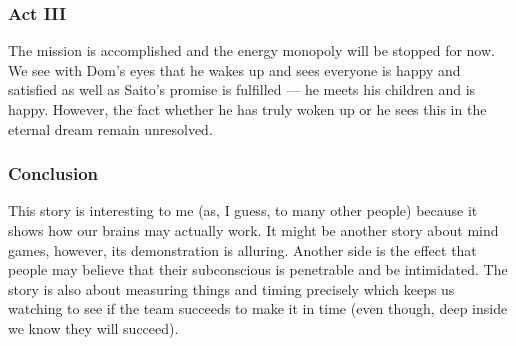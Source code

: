 \documentclass{article}
\begin{document}
\subsubsection*{Act III}

The mission is accomplished and the energy monopoly will be stopped for now. We
see with Dom's eyes that he wakes up and sees everyone is happy and satisfied as
well as Saito's promise is fulfilled --- he meets his children and is happy.
However, the fact whether he has truly woken up or he sees this in the eternal
dream remain unresolved.

\subsubsection*{Conclusion}

This story is interesting to me (as, I guess, to many other people) because it
shows how our brains may actually work. It might be another story about mind
games, however, its demonstration is alluring. Another side is the effect that
people may believe that their subconscious is penetrable and be intimidated.
The story is also about measuring things and timing precisely which keeps us
watching to see if the team succeeds to make it in time (even though, deep
inside we know they will succeed).
\end{document}
